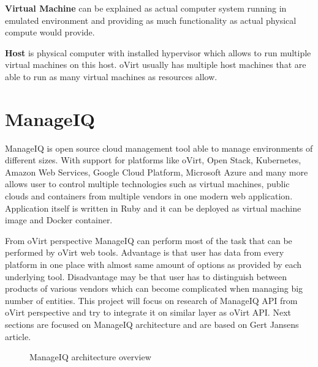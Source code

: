 \textbf{Virtual Machine} can be explained as actual computer system running in emulated environment and providing as much functionality as actual physical compute would provide.

\textbf{Host} is physical computer with installed hypervisor which allows to run multiple virtual machines on this host. oVirt usually has multiple host machines that are able to run as many virtual machines as resources allow.

\chapter{ManageIQ}\label{MIQ}
ManageIQ is open source cloud management tool able to manage environments of different sizes. With support for platforms like oVirt, Open Stack, Kubernetes, Amazon Web Services, Google Cloud Platform, Microsoft Azure and many more allows user to control multiple technologies such as virtual machines, public clouds and containers from multiple vendors in one modern web application.
Application itself is written in Ruby and it can be deployed as virtual machine image and Docker container. 

From oVirt perspective ManageIQ can perform most of the task that can be performed by oVirt web tools. Advantage is that user has data from every platform in one place with almost same amount of options as provided by each underlying tool. Disadvantage may be that user has to distinguish between products of various vendors which can become complicated when managing big number of entities. This project will focus on research of ManageIQ API from oVirt perspective and try to integrate it on similar layer as oVirt API.
Next sections are focused on ManageIQ architecture and are based on Gert Jansens article\cite{ManageIQarchitecture}.

\begin{figure}[h]
\caption{ManageIQ architecture overview\cite{manageIQimg}}
\label{vector}
\end{figure}

